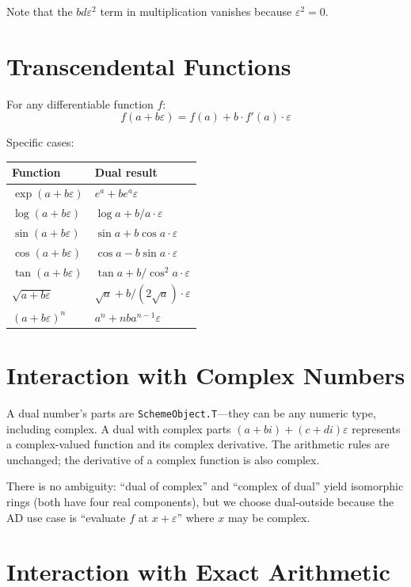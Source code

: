 \documentclass[12pt]{report}
\begin{document}
\noindent Note that the $bd\varepsilon^2$ term in multiplication
vanishes because $\varepsilon^2 = 0$.

\section{Transcendental Functions}

For any differentiable function $f$:
\[
  f(a + b\varepsilon) = f(a) + b \cdot f'(a) \cdot \varepsilon
\]

\noindent Specific cases:

\begin{center}
\begin{tabular}{ll}
\toprule
Function & Dual result \\
\midrule
$\exp(a + b\varepsilon)$ & $e^a + b e^a \varepsilon$ \\
$\log(a + b\varepsilon)$ & $\log a + b/a \cdot \varepsilon$ \\
$\sin(a + b\varepsilon)$ & $\sin a + b \cos a \cdot \varepsilon$ \\
$\cos(a + b\varepsilon)$ & $\cos a - b \sin a \cdot \varepsilon$ \\
$\tan(a + b\varepsilon)$ & $\tan a + b / \cos^2 a \cdot \varepsilon$ \\
$\sqrt{a + b\varepsilon}$ & $\sqrt{a} + b/(2\sqrt{a}) \cdot \varepsilon$ \\
$(a + b\varepsilon)^n$   & $a^n + n b a^{n-1} \varepsilon$ \\
\bottomrule
\end{tabular}
\end{center}

\section{Interaction with Complex Numbers}

A dual number's parts are {\tt SchemeObject.T}---they can be any
numeric type, including complex.  A dual with complex parts
$(a + bi) + (c + di)\varepsilon$ represents a complex-valued function
and its complex derivative.  The arithmetic rules are unchanged;
the derivative of a complex function is also complex.

There is no ambiguity: ``dual of complex'' and ``complex of dual''
yield isomorphic rings (both have four real components), but we
choose dual-outside because the AD use case is ``evaluate $f$ at
$x + \varepsilon$'' where $x$ may be complex.

\section{Interaction with Exact Arithmetic}
\end{document}
